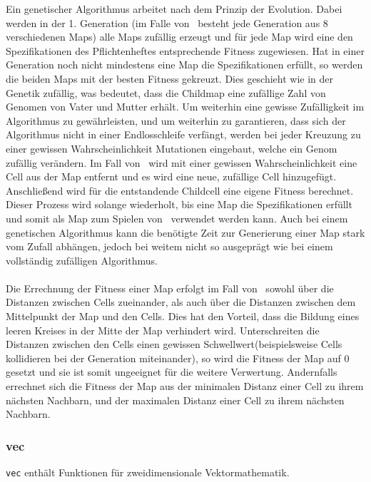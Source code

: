 Ein genetischer Algorithmus arbeitet nach dem Prinzip der Evolution. Dabei werden in der 1. Generation (im Falle von \vires\ besteht jede Generation aus 8 verschiedenen Maps) alle Maps zufällig erzeugt und für jede Map wird eine den Spezifikationen des Pflichtenheftes entsprechende Fitness zugewiesen. Hat in einer Generation noch nicht mindestens eine Map die Spezifikationen erfüllt, so werden die beiden Maps mit der besten Fitness gekreuzt. Dies geschieht wie in der Genetik zufällig, was bedeutet, dass die Childmap eine zufällige Zahl von Genomen von Vater und Mutter erhält. Um weiterhin eine gewisse Zufälligkeit im Algorithmus zu gewährleisten, und um weiterhin zu garantieren, dass sich der Algorithmus nicht in einer Endlosschleife verfängt, werden bei jeder Kreuzung zu einer gewissen Wahrscheinlichkeit Mutationen eingebaut, welche ein Genom zufällig verändern. Im Fall von \vires\ wird mit einer gewissen Wahrscheinlichkeit eine Cell aus der Map entfernt und es wird eine neue, zufällige Cell hinzugefügt. Anschließend wird für die entstandende Childcell eine eigene Fitness berechnet. Dieser Prozess wird solange wiederholt, bis eine Map die Spezifikationen erfüllt und somit als Map zum Spielen von \vires\ verwendet werden kann. Auch bei einem genetischen Algorithmus kann die benötigte Zeit zur Generierung einer Map stark vom Zufall abhängen, jedoch bei weitem nicht so ausgeprägt wie bei einem vollständig zufälligen Algorithmus.
\\
\\
Die Errechnung der Fitness einer Map erfolgt im Fall von \vires\ sowohl über die Distanzen zwischen Cells zueinander, als auch über die Distanzen zwischen dem Mittelpunkt der Map und den Cells. Dies hat den Vorteil, dass die Bildung eines leeren Kreises in der Mitte der Map verhindert wird. Unterschreiten die Distanzen zwischen den Cells einen gewissen Schwellwert(beispielsweise Cells kollidieren bei der Generation miteinander), so wird die Fitness der Map auf 0 gesetzt und sie ist somit ungeeignet für die weitere Verwertung. Andernfalls errechnet sich die Fitness der Map aus der minimalen Distanz einer Cell zu ihrem nächsten Nachbarn, und der maximalen Distanz einer Cell zu ihrem nächsten Nachbarn.


\subsubsection{vec}
\verb+vec+ enthält Funktionen für zweidimensionale Vektormathematik.